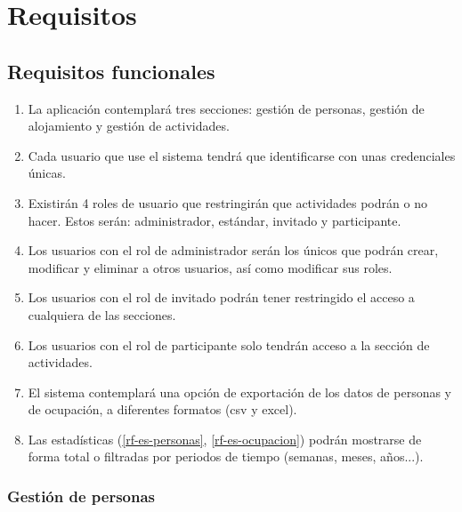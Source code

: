 
\section{Requisitos}

\subsection{Requisitos funcionales}

\begin{enumerate}[start=1,label={RF-\arabic*.}]

    \item La aplicación contemplará tres secciones: gestión de personas, gestión de alojamiento y gestión de actividades.
    \item Cada usuario que use el sistema tendrá que identificarse con unas credenciales únicas.
    \item Existirán 4 roles de usuario que restringirán que actividades podrán o no hacer. Estos serán: administrador, estándar, invitado y participante.
    \item Los usuarios con el rol de administrador serán los únicos que podrán crear, modificar y eliminar a otros usuarios, así como modificar sus roles.
    \item Los usuarios con el rol de invitado podrán tener restringido el acceso a cualquiera de las secciones.
    \item Los usuarios con el rol de participante solo tendrán acceso a la sección de actividades.
    \item El sistema contemplará una opción de exportación de los datos de personas y de ocupación, a diferentes formatos (csv y excel).
    \item Las estadísticas (\ref{rf-es-personas}, \ref{rf-es-ocupacion}) podrán mostrarse de forma total o filtradas por periodos de tiempo (semanas, meses, años...).

\end{enumerate}

\subsubsection{Gestión de personas}

